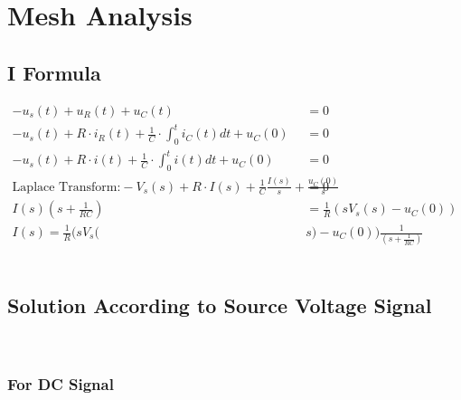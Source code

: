 \documentclass{article}
\begin{document}
\section{Mesh Analysis}
\subsection{I Formula}
\begin{align*}
    -u_s(t)+u_R(t)+u_C(t)&=0 \\
    -u_s(t)+R \cdot i_R(t) + \frac{1}{C}\cdot \int_{0}^{t}i_C(t)dt +u_C(0) &=0 \\
    -u_s(t)+R \cdot i(t) + \frac{1}{C}\cdot \int_{0}^{t}i(t)dt +u_C(0) &=0\\
    \text{Laplace Transform:}     -V_s(s)+R \cdot I(s) + \frac{1}{C} \frac{I(s)}{s} +\frac{u_C(0)}{s} &=0\\
    I(s) (s+ \frac{1}{RC}) &= \frac{1}{R} (s V_s(s) - u_C(0)) \\
    I(s) = \frac{1}{R} (s V_s(&s) - u_C(0))\frac{1}{(s+ \frac{1}{RC})}
\end{align*}\\
\subsection{Solution According to Source Voltage Signal}\\
\subsubsection{For DC Signal}
\end{document}
